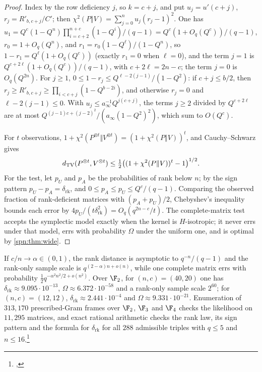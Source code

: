 \begin{proof}
Index by the row deficiency $j$, so $k=c+j$, and put $u_j=u'(c+j)$, $r_j=R'_{b,c+j}/C'$; then
$\chi^2(P\Vert V)=\sum_{j=0}^nu_j(r_j-1)^2$. One has
$u_1=Q^c(1-Q^n)\prod_{i=c+2}^{n+c}(1-Q^i)/(q-1)=Q^c(1+O_q(Q^c))/(q-1)$, $r_0=1+O_q(Q^n)$, and
$r_1=r_0(1-Q^\ell)/(1-Q^n)$, so $1-r_1=Q^\ell(1+O_q(Q^c))$ (exactly $r_1=0$ when $\ell=0$), and the term
$j=1$ is $Q^{c+2\ell}(1+O_q(Q^c))/(q-1)$, with $c+2\ell=2n-c$; the term $j=0$ is $O_q(Q^{2n})$. For
$j\ge1$, $0\le1-r_j\le Q^{\ell-2(j-1)}/(1-Q^2)$: if $c+j\le b/2$, then
$r_j\ge R'_{b,c+j}\ge\prod_{i<c+j}(1-Q^{b-2i})$, and otherwise $r_j=0$ and $\ell-2(j-1)\le0$. With
$u_j\le a_\infty^{-1}Q^{j(c+j)}$, the terms $j\ge2$ divided by $Q^{c+2\ell}$ are at most
$Q^{(j-1)c+(j-2)^2}/(a_\infty(1-Q^2)^2)$, which sum to $O(Q^c)$.

For $t$ observations, $1+\chi^2(P^{\otimes t}\Vert V^{\otimes t})=(1+\chi^2(P\Vert V))^t$, and
Cauchy--Schwarz gives
\[
 d_{\mathrm{TV}}(P^{\otimes t},V^{\otimes t})\le\tfrac12\bigl((1+\chi^2(P\Vert V))^t-1\bigr)^{1/2}.
\]
For the test, let $p_U$ and $p_A$ be the probabilities of rank below $n$; by the sign pattern $p_U-p_A=\delta_{\mathrm{rk}}$,
and $0\le p_A\le p_U\le Q^c/(q-1)$. Comparing the observed fraction of rank-deficient matrices with
$(p_A+p_U)/2$, Chebyshev's inequality bounds each error by
$4p_U/(t\delta_{\mathrm{rk}}^2)=O_q(q^{2n-c}/t)$. The complete-matrix test accepts the symplectic model
exactly when the kernel is $H$-isotropic; it never errs under that model, errs with probability
$\Omega$ under the uniform one, and is optimal by \cref{spn:thm:wide}.
\end{proof}

If $c/n\to\alpha\in(0,1)$, the rank distance is asymptotic to $q^{-n}/(q-1)$ and the rank-only sample
scale is $q^{(2-\alpha)n+o(n)}$, while one complete matrix errs with probability
$\tfrac12q^{-\alpha^2n^2/2+o(n^2)}$. Over $\F_2$, for $(n,c)=(40,20)$ one has
$\delta_{\mathrm{rk}}\approx9.095\cdot10^{-13}$, $\Omega\approx6.372\cdot10^{-58}$ and a rank-only sample
scale $2^{60}$; for $(n,c)=(12,12)$, $\delta_{\mathrm{rk}}\approx2.441\cdot10^{-4}$ and
$\Omega\approx9.331\cdot10^{-21}$. Enumeration of $313{,}170$ prescribed-Gram frames over $\F_2$, $\F_3$
and $\F_4$ checks the likelihood on $11{,}295$ matrices, and exact rational arithmetic checks the rank
law, its sign pattern and the formula for $\delta_{\mathrm{rk}}$ for all $288$ admissible triples with
$q\le5$ and $n\le16$.\footnote{\raggedright{},
}

